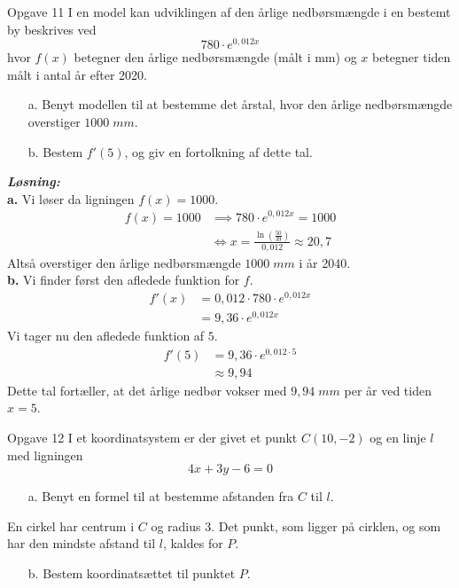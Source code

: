 \documentclass{article}
\newcommand{\sol}{\setlength{\parindent}{0cm}\textbf{\textit{Løsning:}}\setlength{\parindent}{1cm}}
\begin{document}
\begin{question}{Opgave 11}{}
  I en model kan udviklingen af den årlige nedbørsmængde i en bestemt by beskrives ved
  \[
  780 \cdot e^{0,012x}
  \] 
  hvor $f(x)$ betegner den årlige nedbørsmængde (målt i mm) og $x$ betegner tiden målt
i antal år efter 2020. 
\begin{itemize}
  \item[a.] Benyt modellen til at bestemme det årstal, hvor den årlige nedbørsmængde
overstiger $1000 \;\unit{mm} $.
\item[b.] Bestem $f'(5)$, og giv en fortolkning af dette tal.
\end{itemize}
\end{question}
\sol \\
\textbf{a.}
Vi løser da ligningen $f(x)=1000$.
\begin{equation*}
\begin{split}
  f(x)=1000 &\implies 780 \cdot e^{0,012x}=1000\\
  &\iff x=\frac{\ln \left(\frac{50}{39}\right) }{0,012} \approx 20,7
\end{split}
\end{equation*}
Altså overstiger den årlige nedbørsmængde $1000 \;\unit{mm} $ i år 2040. \\[1ex]
\textbf{b.}
Vi finder først den afledede funktion for $f$. 
\begin{equation*}
\begin{split}
  f'(x)&=0,012 \cdot 780 \cdot e^{0,012x}\\ 
  &=9,36 \cdot e^{0,012x}
\end{split}
\end{equation*}
Vi tager nu den afledede funktion af $5$.
\begin{equation*}
\begin{split}
  f'(5)&=9,36 \cdot e^{0,012 \cdot 5}\\ 
  &\approx 9,94
\end{split}
\end{equation*}
Dette tal fortæller, at det årlige nedbør vokser med $9,94 \;\unit{mm} $ per år ved tiden $x=5$. 
\begin{question}{Opgave 12}{}
  I et koordinatsystem er der givet et punkt $C(10,-2)$ og en linje $l$ med ligningen 
  \[
  4x+3y-6=0
  \] 
\begin{itemize}
  \item[a.] Benyt en formel til at bestemme afstanden fra $C$ til $l$. 
\end{itemize}
En cirkel har centrum i $C$ og radius 3.
Det punkt, som ligger på cirklen, og som har den mindste afstand til $l$, kaldes for $P$.
\begin{itemize}
  \item[b.] Bestem koordinatsættet til punktet $P$.
\end{itemize}
\end{question}
\end{document}
